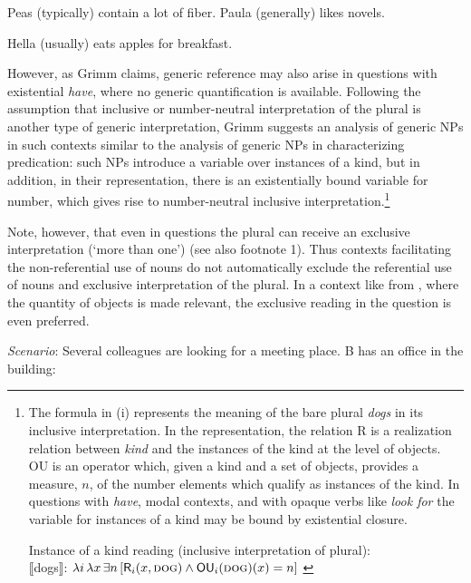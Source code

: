 \documentclass[output=paper,colorlinks,citecolor=brown,
]{langscibook}
\newcommand{\sib}[1]{$\llbracket${#1}$\rrbracket$} %
\newcommand{\cnst}[1]{\textsf{\MakeUppercase{#1}}} %
\begin{document}
\ea\label{ex:10} 
\ea Peas (typically) contain a lot of fiber.
\label{ex:10a}
\ex Paula (generally) likes novels. 
\label{ex:10b}
\z\z

\ea\label{ex:11}
Hella (usually) eats apples for breakfast.
\z 

\noindent However, as Grimm claims, generic reference may also arise in questions with existential \textit{have}, where no generic quantification is available. Following the assumption that inclusive or number-neutral interpretation of the plural is another type of generic interpretation, Grimm suggests an analysis of generic NPs in such contexts similar to the analysis of generic NPs in characterizing predication: such NPs introduce a variable over instances of a kind, but in addition, in their representation, there is an existentially bound variable for number, which gives rise to number-neutral inclusive interpretation.\footnote{\label{fn:InstanceKind} The formula in (i) represents the meaning of the bare plural \textit{dogs} in its inclusive interpretation. In the representation, the relation \cnst{r} is a realization relation between \textit{kind} and the instances of the kind at the level of objects. \cnst{ou} is an operator which, given a kind and a set of objects, provides a measure, $n$, of the number elements which qualify as instances of the kind. In questions with \textit{have}, modal contexts, and with opaque verbs like \textit{look for} the variable for instances of a kind may be bound by existential closure. 

\ea Instance of a kind reading (inclusive interpretation of plural):\\
\sib{dogs}: $\lambda i \, \lambda x \, \exists n \,[\cnst{r}_i (x, \textsc{dog}) \wedge \cnst{ou}_i (\textsc{dog})(x)=n]$ \hfill \citep[7]{Grimm2013}
\z}

Note, however, that even in questions the plural can receive an exclusive interpretation (`more than one') (see also footnote 1). Thus contexts facilitating the non-referential use of nouns do not automatically exclude the referential use of nouns and exclusive interpretation of the plural. In a context like  from \citet{Grimm2013}, where the quantity of objects is made relevant, the exclusive reading in the question is even preferred.

\eanoraggedright\label{ex:12} \textit{Scenario}: Several colleagues are looking for a meeting place. B has an office in the building:
\begin{xlist}
\label{ex:12A:}
\label{ex:12B:}
\end{xlist}
\z
	
\end{document}
